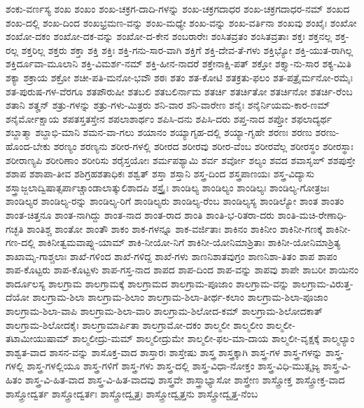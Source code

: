 {ಶಂಕು-ವರ್ಣಸ್ಯ
ಶಂಖ
ಶಂಖಂ
ಶಂಖ-ಚಕ್ರಗ-ದಾದಿ-ಗಳನ್ನು
ಶಂಖ-ಚಕ್ರಗದಾಧರ
ಶಂಖ-ಚಕ್ರಗದಾಧರ-ನಮ್
ಶಂಖದ
ಶಂಖ-ದಲ್ಲಿ
ಶಂಖ-ದಿಂದ
ಶಂಖಭ್ರಮಣ-ವನ್ನು
ಶಂಖ-ಮಧ್ಯೇ
ಶಂಖ-ವನ್ನು
ಶಂಖ-ವರ್ತಿನಾ
ಶಂಖವು
ಶಂಖೈಃ
ಶಂಖೋ
ಶಂಖೋ-ದಕಂ
ಶಂಖೋ-ದಕ-ವನ್ನು
ಶಂಖೋ-ದ-ಕೇನ
ಶಂಬರಾರೇಃ
ಶಂಸಿತವ್ರತಂ
ಶಂಸಿತವ್ರತಾಃ
ಶಕ್ತಃ
ಶಕ್ತನಲ್ಲ
ಶಕ್ತ-ರಲ್ಲ
ಶಕ್ತರಿಲ್ಲ
ಶಕ್ತರು
ಶಕ್ತಾ
ಶಕ್ತಿ
ಶಕ್ತಿಃ
ಶಕ್ತಿ-ಗನು-ಸಾರ-ವಾಗಿ
ಶಕ್ತಿಗೆ
ಶಕ್ತಿ-ದೇವ-ತೆ-ಗಳು
ಶಕ್ತಿಭ್ಯೋ
ಶಕ್ತಿ-ಯುತ-ರಾಗಿಲ್ಲ
ಶಕ್ತಿರ್ದೂವಾ-ಮೂಲಾನಿ
ಶಕ್ತಿ-ವಿಮರ್ಶ-ನಮ್
ಶಕ್ತಿ-ಹೀನ-ನಾದರೆ
ಶಕ್ತೇನಾಕ್ಷಿ-ಪತ್
ಶಕ್ತೋ
ಶಕ್ತ್ಯಾ-ನು-ಸಾರ
ಶಕ್ಯ-ಮಿತಿ
ಶಕ್ಯಾ
ಶಕ್ರಾಯ
ಶಕ್ರೋ
ಶಚೀ-ಪತಿ-ಮನೋ-ಭವೌ
ಶಠಃ
ಶತಂ
ಶತ-ಕೋಟಿ
ಶತಕ್ರತು-ಫಲಂ
ಶತ-ಪತ್ರೈರ್ಮನೋ-ರಮೈಃ
ಶತ-ಪುರುಷ-ಗಳ-ವೆರಗೂ
ಶತಪೌರುಷೀ
ಶತಬಲಿ
ಶತಬಲಿರ್ನಾಮ
ಶತರ್ಚಿ
ಶತರ್ಚಿತೋ
ಶತರ್ಚಿನೋ
ಶತರ್ಚಿ-ರೆಂಬ
ಶತಾನಿ
ಶತೄನ್
ಶತ್ರು-ಗಳನ್ನು
ಶತ್ರು-ಗಳು-ಮಿತ್ರರು
ಶನಿ-ವಾರ
ಶನಿ-ವಾರೇಣ
ಶನೈಃ
ಶನೈರ್ನಿಯಮ-ಕಾರ-ಣಮ್
ಶನೈರ್ಮೋಕ್ಷಾಯ
ಶಪತಸ್ತತಸ್ತೇನ
ಶಪಲಾಶಾರ್ಥಂ
ಶಪಿಸಿ-ದನು
ಶಪಿಸಿ-ದರು
ಶಪ್ತ-ನಾದ
ಶಪ್ತೋ
ಶಫಲಾದ್ಯರ್ಥ
ಶಬ್ದಾತ್ಮಾ
ಶಬ್ದಾಭಿ-ಮಾನಿ
ಶಮನ-ವಾ-ಗಲು
ಶಯಾನಂ
ಶಯ್ಯಾಗೃಹ-ದಲ್ಲಿ
ಶಯ್ಯಾ-ಗೃಹೇ
ಶರಣಃ
ಶರಣು
ಶರಣು-ಹೊಂದ-ಬೇಕು
ಶರಣ್ಯಂ
ಶರಣ್ಯನು
ಶರೀರ-ಗಳಲ್ಲಿ
ಶರೀರದ
ಶರೀರವು
ಶರೀರ-ವೆಂಬ
ಶರೀರವೆಲ್ಲ
ಶರೀರಸ್ಥಂ
ಶರೀರಸ್ಥಾಃ
ಶರೀರಾಣ್ಯಪಿ
ಶರೀರಿಣಾಂ
ಶರೀರಿಸು
ಶರೈಸ್ತಯೋಃ
ಶರ್ಮಪಶ್ಯಾಮಿ
ಶರ್ವ
ಶರ್ವೋ
ಶಲ್ಯಂ
ಶವದ
ಶವಾಸೃಙ್
ಶಶಪುಸ್ತೇ
ಶಶಾಪ
ಶಶಾಪಾ-ತೀವ
ಶಶಿಗ್ರಹಶತಾಧಿಕಃ
ಶಶ್ವತ್
ಶಸ್ತಾ
ಶಸ್ತಾನಿ
ಶಸ್ತ್ರ-ದಿಂದ
ಶಸ್ತ್ರಪಾಣಯಃ
ಶಸ್ತ್ರ-ವಿದ್ಯಾಸು
ಶಸ್ತ್ರಾಜ್ಜಲಾದ್ವಿಷಾತ್ಸರ್ಪಾಚ್ಚಾಂಡಾಲಾತ್ಕುಲಿಶಾದಪಿ
ಶಸ್ತ್ರೈಃ
ಶಾಂಡಿಲ್ಯ
ಶಾಂಡಿಲ್ಯಂ
ಶಾಂಡಿಲ್ಯಃ
ಶಾಂಡಿಲ್ಯ-ಗೋತ್ರಜಃ
ಶಾಂಡಿಲ್ಯರ
ಶಾಂಡಿಲ್ಯ-ರನ್ನು
ಶಾಂಡಿಲ್ಯ-ರಿಗೆ
ಶಾಂಡಿಲ್ಯರು
ಶಾಂಡಿಲ್ಯ-ರೆಂಬ
ಶಾಂಡಿಲ್ಯಸ್ಯ
ಶಾಂಡಿಲ್ಯೋ
ಶಾಂತ
ಶಾಂತಂ
ಶಾಂತ-ಚಿತ್ತನೂ
ಶಾಂತ-ನಾಗಿದ್ದು
ಶಾಂತ-ನಾದ
ಶಾಂತ-ರಾದ
ಶಾಂತಿ
ಶಾಂತಿ-ಭ-ರಿತರಾ-ದರು
ಶಾಂತಿ-ಮಚಿ-ರೇಣಾಧಿ-ಗಚ್ಛತಿ
ಶಾಂತಿಶ್ಚ
ಶಾಂತೋ
ಶಾಂತೌ
ಶಾಕಂ
ಶಾಕ-ಗಳನ್ನೂ
ಶಾಕ-ವರ್ಜಿತಾಃ
ಶಾಕಿನಂ
ಶಾಕಿನೀಂ
ಶಾಕಿನೀ-ಗಣಕ್ಕೆ
ಶಾಕಿನೀ-ಗಣ-ದಲ್ಲಿ
ಶಾಕಿನೀತ್ವಮವಾಪ್ನು-ಯಾಮ್
ಶಾಕಿ-ನೀಯೋ-ನಿಗೆ
ಶಾಕಿನೀ-ಯೋನಿಮಾಶ್ರಿತಾಃ
ಶಾಕಿನೀ-ಯೋನಿಮಾಶ್ರಿತ್ಯ
ಶಾಖಾಮೃ-ಗಾಶ್ಚಲಾಃ
ಶಾಖೆ-ಗಳಿಂದ
ಶಾಖೆ-ಗಳಿದ್ದ
ಶಾಖೆ-ಗಳು
ಶಾಣನಿಶಾತವುಗ್ರಂ
ಶಾಣನಿಶಾ-ತಿತಂ
ಶಾಪ
ಶಾಪಂ
ಶಾಪ-ಕೊಟ್ಟರು
ಶಾಪ-ಕೊಟ್ಟಳು
ಶಾಪ-ಗಸ್ತ-ನಾದ
ಶಾಪದ
ಶಾಪ-ದಿಂದ
ಶಾಪ-ವನ್ನು
ಶಾಪವು
ಶಾಪೇ
ಶಾಬರೀ
ಶಾಯಿನಂ
ಶಾರ್ದೂಲಸ್ಯ
ಶಾಲಗ್ರಾಮ
ಶಾಲಗ್ರಾಮಕ್ಕೆ
ಶಾಲಗ್ರಾಮದ
ಶಾಲಗ್ರಾಮ-ಪೂಜಾಂ
ಶಾಲಗ್ರಾಮ-ವನ್ನು
ಶಾಲಗ್ರಾಮ-ವಿರುತ್ತ-ದೆಯೋ
ಶಾಲಗ್ರಾಮ-ಶಿಲಾ
ಶಾಲಗ್ರಾಮ-ಶಿಲಾಂ
ಶಾಲಗ್ರಾಮ-ಶಿಲಾ-ತೀರ್ಥ-ಕಲಾಂ
ಶಾಲಗ್ರಾಮ-ಶಿಲಾ-ಪೂಜಾಂ
ಶಾಲಗ್ರಾಮ-ಶಿಲಾ-ವಾಪಿ
ಶಾಲಗ್ರಾಮ-ಶಿಲಾ-ವಾರಿ
ಶಾಲಗ್ರಾಮ-ಶಿಲೋದ-ಕಮ್
ಶಾಲಗ್ರಾಮ-ಶಿಲೋದಕಾತ್
ಶಾಲಗ್ರಾಮ-ಶಿಲೋದಕೈಃ
ಶಾಲಗ್ರಾಮಾರ್ಪಿತಾ
ಶಾಲಗ್ರಾಮೋ-ದಕಂ
ಶಾಲ್ಮಲೀ
ಶಾಲ್ಮಲೀಂ
ಶಾಲ್ಮಲೀ-ತಟಾಮೀಯುಷಾಮ್
ಶಾಲ್ಮಲೀದ್ರು-ಮಮ್
ಶಾಲ್ಮಲೀದ್ರುಮೇ
ಶಾಲ್ಮಲೀ-ಫಲ-ಮಾ-ದಾಯ
ಶಾಲ್ಮಲೀ-ವೃಕ್ಷಕ್ಕೆ
ಶಾಲ್ಮಲ್ಯಾಂ
ಶಾಶ್ವತ-ವಾದ
ಶಾಸನ-ವನ್ನು
ಶಾಸೊಕ್ತ-ವಾದ
ಶಾಸ್ತಾರಃ
ಶಾಸ್ತೇಷು
ಶಾಸ್ತ್ರ
ಶಾಸ್ತ್ರಕ್ಕಾಗಿ
ಶಾಸ್ತ್ರ-ಗಳ
ಶಾಸ್ತ್ರ-ಗಳನ್ನು
ಶಾಸ್ತ್ರ-ಗಳಲ್ಲಿ
ಶಾಸ್ತ್ರ-ಗಳಲ್ಲಿಯೂ
ಶಾಸ್ತ್ರ-ಗಳಿಗೆ
ಶಾಸ್ತ್ರ-ಗಳು
ಶಾಸ್ತ್ರ-ದಲ್ಲಿ
ಶಾಸ್ತ್ರ-ವಿಧಾ-ನೋಕ್ತಂ
ಶಾಸ್ತ್ರ-ವಿಧಿ-ಮುತ್ಸೃಜ್ಯ
ಶಾಸ್ತ್ರ-ವಿ-ಹಿತಂ
ಶಾಸ್ತ್ರ-ವಿ-ಹಿತ-ವಾದ
ಶಾಸ್ತ್ರ-ವಿ-ಹಿತ-ವಾದವು
ಶಾಸ್ತ್ರವೇ
ಶಾಸ್ತ್ರಾಭ್ಯಾಸೋ
ಶಾಸ್ತ್ರೇಣ
ಶಾಸ್ತ್ರೋಕ್ತ
ಶಾಸ್ತ್ರೋಕ್ತ-ವಾದ
ಶಾಸ್ತ್ರೋದ್ವರ್ತ
ಶಾಸ್ತ್ರೋದ್ವರ್ತಃ
ಶಾಸ್ತ್ರೋದ್ವೃತ್ತಃ
ಶಾಸ್ತ್ರೋದ್ವೃತ್ತನು
ಶಾಸ್ತ್ರೋದ್ವೃತ್ತ-ನೆಂಬ
}
